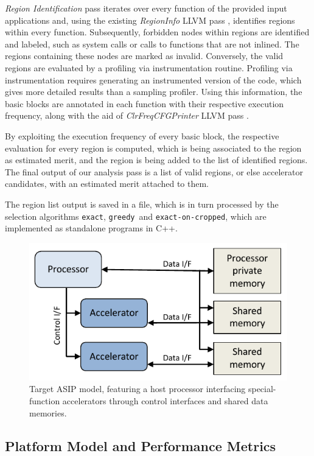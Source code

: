 \documentclass[]{usiinfthesis}
\newcommand{\exact}{\texttt{exact}}
\newcommand{\greedy}{\texttt{greedy}}
\newcommand{\exactC}{\texttt{exact-on-cropped}}
\begin{document}
\emph{Region Identification} pass iterates over every function of the provided 
input applications and, using the existing \emph{RegionInfo} LLVM pass 
\cite{GrosserApr12}, identifies regions within every function. Subsequently, 
forbidden nodes within regions are identified and labeled, such as system
calls or calls to functions that are not inlined. The regions containing
these nodes are marked as invalid. Conversely, the valid regions are 
evaluated by a profiling via instrumentation routine.
Profiling via
instrumentation requires generating an instrumented version of the
code, which gives more detailed results than a sampling
profiler. Using this information, the basic blocks are annotated
 in each function with their respective execution frequency, along
 with the aid of \emph{ClrFreqCFGPrinter} LLVM pass \cite{ZacharopoulosMar17}.\par
 

By exploiting the execution frequency of every basic block, the respective evaluation 
for every region is computed, which is being associated to the region as estimated merit, 
and the region is being added to the list of identified regions.
The final output of our analysis pass is a list of valid regions, 
or else accelerator candidates, with an estimated merit attached to them.\par

The region list output is saved in a file, which is in turn processed by the 
selection algorithms \exact, \greedy\ and \exactC, which are 
implemented as standalone programs in C++.

\begin{figure}
\centering
\includegraphics[width= .6 \linewidth]{figs/platform.pdf}
\caption{Target ASIP model, featuring a host processor interfacing
  special-function accelerators through control interfaces and shared
  data memories.}
\label{fig:platform}
\end{figure}

\subsection{Platform Model and Performance Metrics}
\label{subsec:platform}
\end{document}
